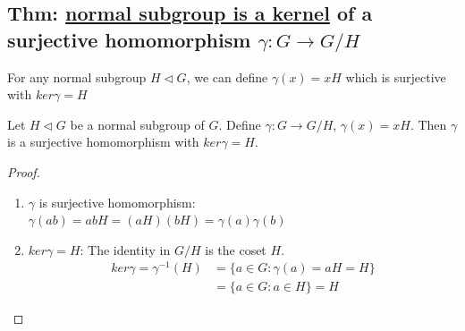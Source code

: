 \documentclass[11pt]{elegantbook}
\begin{document}
\subsection{Thm: \underline{normal subgroup is a kernel} of a surjective homomorphism $\gamma: G \rightarrow G/H$}
For any normal subgroup $H\lhd G$, we can define $\gamma(x)=xH$ which is surjective with $ker \gamma=H$
\begin{theorem}
Let $H \lhd G$ be a normal subgroup of $G$. Define $\gamma: G \rightarrow G/H$, $\gamma(x)=xH$. Then $\gamma$ is a surjective homomorphism with $ker \gamma=H$.
\end{theorem}
\begin{proof}
    \quad
\begin{enumerate}
    \item $\gamma$ is surjective homomorphism: $\gamma(ab)=abH=(aH)(bH)=\gamma(a)\gamma(b)$
    \item $ker\gamma=H$: The identity in $G/H$ is the coset $H$.
    \begin{equation}
        \begin{aligned}
            ker\gamma=\gamma^{-1}(H)&=\{a\in G: \gamma(a)=aH=H\}\\
            &=\{a\in G: a\in H\}=H
        \end{aligned}
        \nonumber
    \end{equation}
\end{enumerate}
\end{proof}
\end{document}

